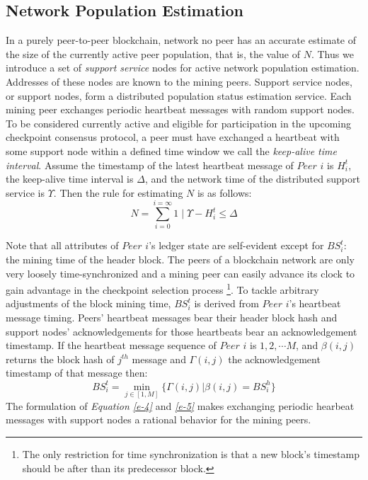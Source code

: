 \subsection{Network Population Estimation}
In a purely peer-to-peer blockchain, network no peer has an accurate estimate of the size of the currently active peer population, that is, the value of $N$. Thus we introduce a set of \textit{support service} nodes for active network population estimation. Addresses of these nodes are known to the mining peers. Support service nodes, or support nodes, form a distributed population status estimation service. Each mining peer exchanges periodic heartbeat messages with random support nodes. To be considered currently active and eligible for participation in the upcoming checkpoint consensus protocol, a peer must have exchanged a heartbeat with some support node within a defined time window we call the \textit{keep-alive time interval}. Assume the timestamp of the latest heartbeat message of $Peer$ $i$ is $H_i^t$, the keep-alive time interval is $\Delta$, and the network time of the distributed support service is $\Upsilon$. Then the rule for estimating $N$ is as follows:  
\begin{equation}
\label{e-4}
N = \sum_{i = 0}^{i = \infty}{1 \mid \Upsilon - H_i^t \leq \Delta}
\end{equation}

Note that all attributes of $Peer$ $i$'s ledger state are self-evident except for $BS_i^t$: the mining time of the header block. The peers of a blockchain network are only very loosely time-synchronized \cite{Turek:1992:MFC:136541.136542} and a mining peer can easily advance its clock to gain advantage in the checkpoint selection process \footnote{The only restriction for time synchronization is that a new block's timestamp should be after than its predecessor block.}. To tackle arbitrary adjustments of the block mining time, $BS_i^t$ is derived from $Peer$ $i$'s heartbeat message timing. Peers' heartbeat messages bear their header block hash and support nodes' acknowledgements for those heartbeats bear an acknowledgement timestamp. If the heartbeat message sequence of $Peer$ $i$ is $1, 2, \cdots M$, and $\beta(i,j)$ returns the block hash of $j^{th}$ message and $\Gamma(i, j)$ the acknowledgement timestamp of that message then:
\begin{equation}
\label{e-5}
BS_i^t = \min_{j \in \left[ 1, M \right]}\{\Gamma(i, j) | \beta(i,j) = BS_i^h \}
\end{equation}
The formulation of \textit{Equation \ref{e-4}} and \textit{\ref{e-5}} makes exchanging periodic hearbeat messages with support nodes a rational behavior for the mining peers.


